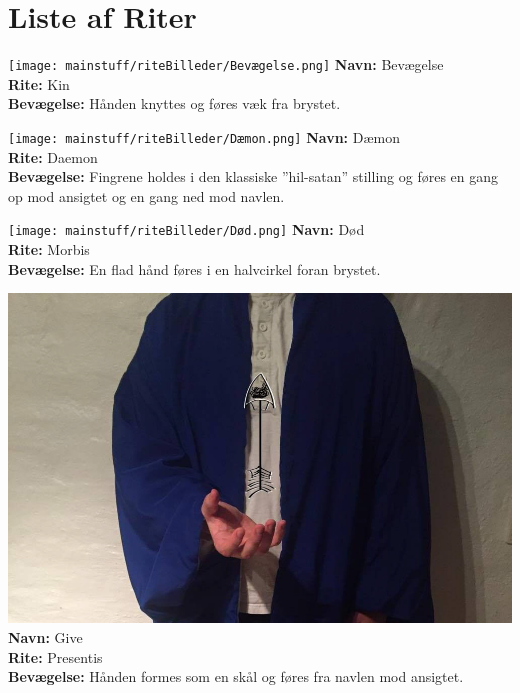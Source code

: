 \chapter*{Liste af Riter}
\begin{rite*}[Bevægelse]
    \centering
    \texttt{[image: mainstuff/riteBilleder/Bevægelse.png]}
\Large \textbf{Navn:} Bevægelse\\
\textbf{Rite:} Kin\\
\textbf{Bevægelse:} Hånden knyttes og føres væk fra brystet.\\
\end{rite*}

\begin{rite*}[Dæmon]
    \centering
    \texttt{[image: mainstuff/riteBilleder/Dæmon.png]}
\Large \textbf{Navn:} Dæmon\\
\textbf{Rite:} Daemon\\
\textbf{Bevægelse:} Fingrene holdes i den klassiske ”hil-satan” stilling og føres en gang op mod ansigtet og en gang ned mod navlen.
\end{rite*}

\begin{rite*}[Død]
    \centering
    \texttt{[image: mainstuff/riteBilleder/Død.png]}
\Large \textbf{Navn:} Død\\
\textbf{Rite:} Morbis\\
\textbf{Bevægelse:} En flad hånd føres i en halvcirkel foran brystet.
\end{rite*}

\begin{rite*}[Give]
    \centering
    \includegraphics[width=\textwidth]{mainstuff/riteBilleder/Give.png}
\Large \textbf{Navn:} Give\\
\textbf{Rite:} Presentis\\
\textbf{Bevægelse:} Hånden formes som en skål og føres fra navlen mod ansigtet.
\end{rite*}

